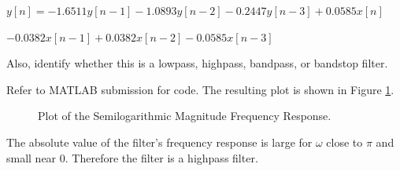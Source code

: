 \documentclass[fleqn]{article}
\begin{document}
\begin{enumerate}[nolistsep]
		$y[n] = -1.6511y[n-1] - 1.0893y[n-2] - 0.2447y[n-3] + 0.0585x[n]$
		
		$- 0.0382x[n-1] + 0.0382x[n-2] - 0.0585x[n-3]$
		
		Also, identify whether this is a lowpass, highpass, bandpass, or bandstop filter.
		
		Refer to MATLAB submission for code. The resulting plot is shown in Figure \ref{prob5_mag_freq_response}.
		
		\begin{figure}[H]				
			\centerline{}
			\caption{Plot of the Semilogarithmic Magnitude Frequency Response.}
			\label{prob5_mag_freq_response}
		\end{figure}
		
		The absolute value of the filter's frequency response is large for $\omega$ close to $\pi$ and small near $0$. Therefore the filter is a highpass filter.
		
	\end{enumerate}
	
\end{document}
